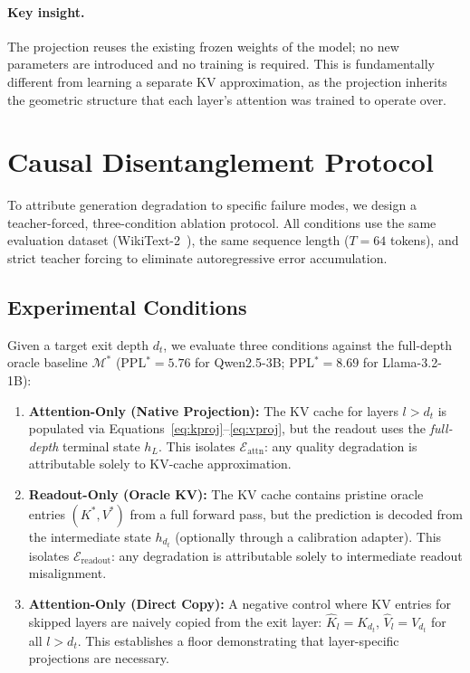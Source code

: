 \documentclass{article}
\newcommand{\Eattn}{\mathcal{E}_{\text{attn}}}
\newcommand{\Ereadout}{\mathcal{E}_{\text{readout}}}
\newcommand{\dt}{d_t}
\newcommand{\Khat}{\hat{K}}
\newcommand{\Vhat}{\hat{V}}
\begin{document}
\paragraph{Key insight.}
The projection reuses the existing frozen weights of the model; no new parameters are introduced and no training is required. This is fundamentally different from learning a separate KV approximation, as the projection inherits the geometric structure that each layer's attention was trained to operate over.

\section{Causal Disentanglement Protocol}
\label{sec:protocol}

To attribute generation degradation to specific failure modes, we design a teacher-forced, three-condition ablation protocol. All conditions use the same evaluation dataset (WikiText-2~\cite{merity2017pointer}), the same sequence length ($T = 64$ tokens), and strict teacher forcing to eliminate autoregressive error accumulation.

\subsection{Experimental Conditions}

Given a target exit depth $\dt$, we evaluate three conditions against the full-depth oracle baseline $\mathcal{M}^*$ (PPL$^* = 5.76$ for Qwen2.5-3B; PPL$^* = 8.69$ for Llama-3.2-1B):

\begin{enumerate}[nosep,leftmargin=*]
    \item \textbf{Attention-Only (Native Projection):} The KV cache for layers $l > \dt$ is populated via Equations~\eqref{eq:kproj}--\eqref{eq:vproj}, but the readout uses the \emph{full-depth} terminal state $h_L$. This isolates $\Eattn$: any quality degradation is attributable solely to KV-cache approximation.
    
    \item \textbf{Readout-Only (Oracle KV):} The KV cache contains pristine oracle entries $(K^*, V^*)$ from a full forward pass, but the prediction is decoded from the intermediate state $h_{\dt}$ (optionally through a calibration adapter). This isolates $\Ereadout$: any degradation is attributable solely to intermediate readout misalignment.
    
    \item \textbf{Attention-Only (Direct Copy):} A negative control where KV entries for skipped layers are naively copied from the exit layer: $\Khat_l = K_{\dt}$, $\Vhat_l = V_{\dt}$ for all $l > \dt$. This establishes a floor demonstrating that layer-specific projections are necessary.
\end{enumerate}
\end{document}
